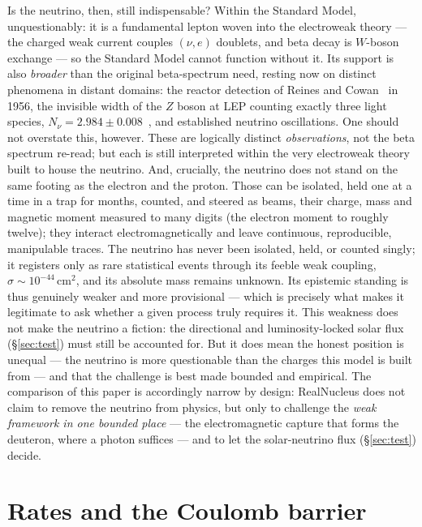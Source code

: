 \documentclass[11pt]{article}
\begin{document}
Is the neutrino, then, still indispensable? Within the Standard Model, unquestionably: it is a
fundamental lepton woven into the electroweak theory --- the charged weak current couples $(\nu,e)$
doublets, and beta decay is $W$-boson exchange --- so the Standard Model cannot function without it. Its
support is also \emph{broader} than the original beta-spectrum need, resting now on distinct phenomena
in distant domains: the reactor detection of Reines and Cowan~\cite{ReinesCowan} in 1956, the invisible
width of the $Z$ boson at LEP counting exactly three light species,
$N_\nu=2.984\pm0.008$~\cite{LEP}, and established neutrino oscillations. One should not overstate this,
however. These are logically distinct \emph{observations}, not the beta spectrum re-read; but each is
still interpreted within the very electroweak theory built to house the neutrino. And, crucially, the
neutrino does not stand on the same footing as the electron and the proton. Those can be isolated,
held one at a time in a trap for months, counted, and steered as beams, their charge, mass and
magnetic moment measured to many digits (the electron moment to roughly twelve); they interact
electromagnetically and leave continuous, reproducible, manipulable traces. The neutrino has never been
isolated, held, or counted singly; it registers only as rare statistical events through its feeble weak
coupling, $\sigma\sim10^{-44}\,\mathrm{cm^2}$, and its absolute mass remains unknown. Its epistemic
standing is thus genuinely weaker and more provisional --- which is precisely what makes it legitimate
to ask whether a given process truly requires it. This weakness does not make the neutrino a fiction:
the directional and luminosity-locked solar flux (\S\ref{sec:test}) must still be accounted for. But it
does mean the honest position is unequal --- the neutrino is more questionable than the charges this
model is built from --- and that the challenge is best made bounded and empirical. The comparison of
this paper is accordingly narrow by design: RealNucleus does not claim to remove the neutrino from
physics, but only to challenge the \emph{weak framework in one bounded place} --- the electromagnetic
capture that forms the deuteron, where a photon suffices --- and to let the solar-neutrino flux
(\S\ref{sec:test}) decide.

\section{Rates and the Coulomb barrier}
\end{document}
